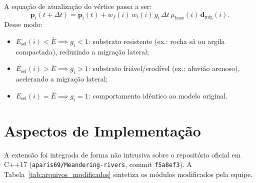 \documentclass[10pt,twocolumn,a4paper]{article}
\begin{document}
A equação de atualização do vértice passa a ser:
\begin{equation}
    \mathbf{p}_i(t + \Delta t) = \mathbf{p}_i(t) + w_f(i) \, w_t(i) \, g_i \, \Delta t \, \mu_{\text{base}}(i) \, \mathbf{d}_{\text{mig}}(i).
    \label{eq:modified_step}
\end{equation}
Desse modo:
\begin{itemize}
    \item $E_{\text{sel}}(i) < \bar{E} \implies g_i < 1$: substrato resistente (ex.: rocha sã ou argila compactada), reduzindo a migração lateral;
    \item $E_{\text{sel}}(i) > \bar{E} \implies g_i > 1$: substrato friável/erodível (ex.: aluvião arenoso), acelerando a migração lateral;
    \item $E_{\text{sel}}(i) = \bar{E} \implies g_i = 1$: comportamento idêntico ao modelo original.
\end{itemize}

\section{Aspectos de Implementação}
\label{sec:implementacao}

A extensão foi integrada de forma não intrusiva sobre o repositório oficial em C++17 (\texttt{aparis69/Meandering-rivers}, commit \texttt{f5a8ef3}). A Tabela~\ref{tab:arquivos_modificados} sintetiza os módulos modificados pela equipe.
\end{document}
